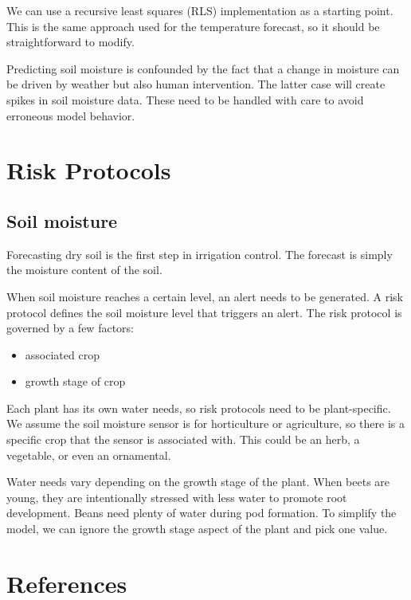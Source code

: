 \documentclass[
]{book}
\providecommand{\tightlist}{%
  \setlength{\itemsep}{0pt}\setlength{\parskip}{0pt}}
\begin{document}
We can use a recursive least squares (RLS) implementation as a starting point. This is the same approach used for the temperature forecast, so it should be straightforward to modify.

Predicting soil moisture is confounded by the fact that a change in moisture can be driven by weather but also human intervention. The latter case will create spikes in soil moisture data. These need to be handled with care to avoid erroneous model behavior.

\hypertarget{risk-protocols}{%
\chapter{Risk Protocols}\label{risk-protocols}}

\hypertarget{soil-moisture-1}{%
\section{Soil moisture}\label{soil-moisture-1}}

Forecasting dry soil is the first step in irrigation control.
The forecast is simply the moisture content of the soil.

When soil moisture reaches a certain level, an alert needs to be generated.
A risk protocol defines the soil moisture level that triggers an alert.
The risk protocol is governed by a few factors:

\begin{itemize}
\tightlist
\item
  associated crop
\item
  growth stage of crop
\end{itemize}

Each plant has its own water needs, so risk protocols need to be plant-specific.
We assume the soil moisture sensor is for horticulture or agriculture,
so there is a specific crop that the sensor is associated with.
This could be an herb, a vegetable, or even an ornamental.

Water needs vary depending on the growth stage of the plant.
When beets are young, they are intentionally stressed with less water to promote root development.
Beans need plenty of water during pod formation.
To simplify the model, we can ignore the growth stage aspect of the plant and pick one value.

\hypertarget{references}{%
\chapter{References}\label{references}}

  
\end{document}
